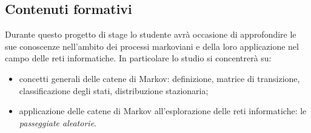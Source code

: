 \subsection{Contenuti formativi}
Durante questo progetto di stage lo studente avrà occasione di approfondire le sue conoscenze nell'ambito dei processi markoviani e della loro applicazione nel campo delle reti informatiche.
	\newline
	In particolare lo studio si concentrerà su:
	\begin{itemize}
		\item concetti generali delle catene di Markov: definizione, matrice di transizione, classificazione degli stati, distribuzione stazionaria;
		\item applicazione delle catene di Markov all'esplorazione delle reti informatiche: le \textit{passeggiate aleatorie}.
	\end{itemize}
